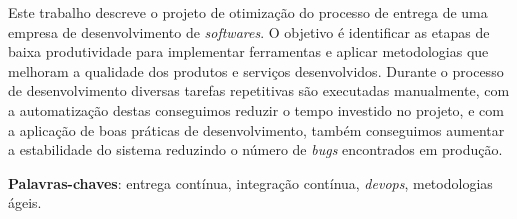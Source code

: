 \documentclass[
	12pt,				%
	openright,			%
	oneside,			%
	a4paper,			%
	english,			%
	french,				%
	spanish,			%
	brazil,				%
	]{abntex2}
\begin{document}

\frenchspacing 


\imprimircapa

\imprimirfolhaderosto*



\setlength{\absparsep}{18pt} %
\begin{resumo}
 Este trabalho descreve o projeto de otimização do processo de entrega de uma empresa de desenvolvimento de \textit{softwares}. O objetivo é identificar as etapas de baixa produtividade para implementar ferramentas e aplicar metodologias que melhoram a qualidade dos produtos e serviços desenvolvidos. Durante o processo de desenvolvimento diversas tarefas repetitivas são executadas manualmente, com a automatização destas conseguimos reduzir o tempo investido no projeto, e com a aplicação de boas práticas de desenvolvimento, também conseguimos aumentar a estabilidade do sistema reduzindo o número de \textit{bugs} encontrados em produção.

 \noindent
 \textbf{Palavras-chaves}: entrega contínua, integração contínua, \textit{devops}, metodologias ágeis.
\end{resumo}


\listoftables*
\end{document}
